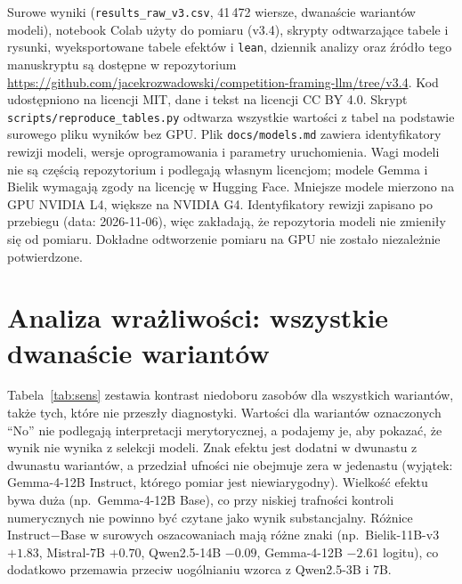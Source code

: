 \documentclass[11pt]{article}
\begin{document}
Surowe wyniki (\texttt{results\_raw\_v3.csv}, 41\,472 wiersze, dwanaście wariantów modeli), notebook Colab użyty do pomiaru (v3.4), skrypty odtwarzające tabele i rysunki, wyeksportowane tabele efektów i \texttt{lean}, dziennik analizy oraz źródło tego manuskryptu są dostępne w repozytorium \url{https://github.com/jacekrozwadowski/competition-framing-llm/tree/v3.4}. Kod udostępniono na licencji MIT, dane i tekst na licencji CC BY 4.0. Skrypt \texttt{scripts/reproduce\_tables.py} odtwarza wszystkie wartości z tabel na podstawie surowego pliku wyników bez GPU. Plik \texttt{docs/models.md} zawiera identyfikatory rewizji modeli, wersje oprogramowania i parametry uruchomienia. Wagi modeli nie są częścią repozytorium i podlegają własnym licencjom; modele Gemma i Bielik wymagają zgody na licencję w Hugging Face. Mniejsze modele mierzono na GPU NVIDIA L4, większe na NVIDIA G4. Identyfikatory rewizji zapisano po przebiegu (data: 2026-11-06), więc zakładają, że repozytoria modeli nie zmieniły się od pomiaru. Dokładne odtworzenie pomiaru na GPU nie zostało niezależnie potwierdzone.

\appendix
\section{Analiza wrażliwości: wszystkie dwanaście wariantów}\label{app:sens}
Tabela~\ref{tab:sens} zestawia kontrast niedoboru zasobów dla wszystkich wariantów, także tych, które nie przeszły diagnostyki. Wartości dla wariantów oznaczonych ``No'' nie podlegają interpretacji merytorycznej, a podajemy je, aby pokazać, że wynik nie wynika z selekcji modeli. Znak efektu jest dodatni w dwunastu z dwunastu wariantów, a przedział ufności nie obejmuje zera w jedenastu (wyjątek: Gemma-4-12B Instruct, którego pomiar jest niewiarygodny). Wielkość efektu bywa duża (np.\ Gemma-4-12B Base), co przy niskiej trafności kontroli numerycznych nie powinno być czytane jako wynik substancjalny. Różnice Instruct$-$Base w surowych oszacowaniach mają różne znaki (np.\ Bielik-11B-v3 $+1.83$, Mistral-7B $+0.70$, Qwen2.5-14B $-0.09$, Gemma-4-12B $-2.61$ logitu), co dodatkowo przemawia przeciw uogólnianiu wzorca z Qwen2.5-3B i 7B.
\end{document}
